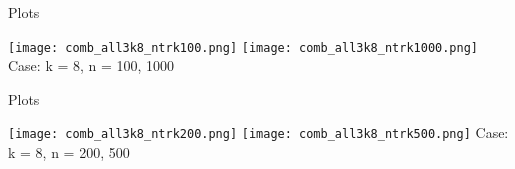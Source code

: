 \documentclass[aspectratio=169,compress,10pt]{beamer} %
\begin{document}
\begin{frame}{Plots}
\begin{adjustwidth}{-2em}{-2em}
\texttt{[image: comb\_all3k8\_ntrk100.png]}
\texttt{[image: comb\_all3k8\_ntrk1000.png]}
Case: k = 8, n = 100, 1000
\end{adjustwidth}
\end{frame}

\begin{frame}{Plots}
\begin{adjustwidth}{-2em}{-2em}
\texttt{[image: comb\_all3k8\_ntrk200.png]}
\texttt{[image: comb\_all3k8\_ntrk500.png]}
Case: k = 8, n = 200, 500
\end{adjustwidth}
\end{frame}
\end{document}
